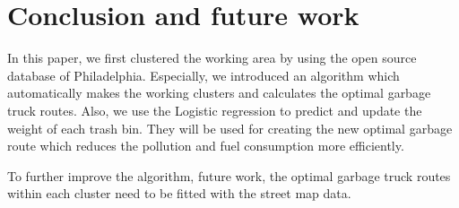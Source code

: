 \documentclass[conference,compsoc]{IEEEtran}
\begin{document}
\section{Conclusion and future work}
In this paper, we first clustered the working area by using the open source database of Philadelphia. Especially, we introduced an algorithm which automatically makes the working clusters and calculates the optimal garbage truck routes. Also, we use the Logistic regression to predict and update the weight of each trash bin. They will be used for creating the new optimal garbage route which reduces the pollution and fuel consumption more efficiently.  

To further improve the algorithm, future work, the optimal garbage truck routes within each cluster need to be fitted with the street map data.
 
 
 
 
 
 
 
\ifCLASSOPTIONcompsoc



 
 
 
 
 
 
 
\end{document}
